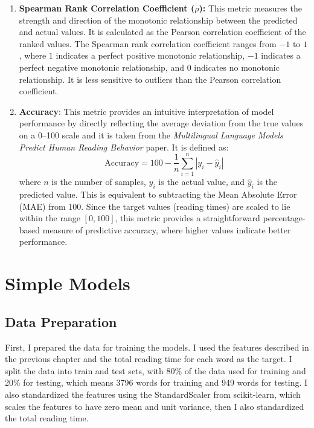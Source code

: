 \begin{enumerate}
    \item \textbf{Spearman Rank Correlation Coefficient ($\rho$):} This metric measures the strength and direction of the monotonic relationship between the predicted and actual values. It is calculated as the Pearson correlation coefficient of the ranked values. The Spearman rank correlation coefficient ranges from $-1$ to $1$, where $1$ indicates a perfect positive monotonic relationship, $-1$ indicates a perfect negative monotonic relationship, and $0$ indicates no monotonic relationship. It is less sensitive to outliers than the Pearson correlation coefficient.
    
    \item \textbf{Accuracy}: This metric provides an intuitive interpretation of model performance by directly reflecting the average deviation from the true values on a 0–100 scale and it is taken from the \textit{Multilingual Language Models Predict Human Reading Behavior} \cite{hollenstein-etal-2021-multilingual} paper. It is defined as:
    \begin{equation}
        \text{Accuracy} = 100 - \frac{1}{n} \sum_{i=1}^{n} |y_i - \hat{y}_i|
    \end{equation}
    where \( n \) is the number of samples, \( y_i \) is the actual value, and \( \hat{y}_i \) is the predicted value. This is equivalent to subtracting the Mean Absolute Error (MAE) from 100. Since the target values (reading times) are scaled to lie within the range \([0, 100]\), this metric provides a straightforward percentage-based measure of predictive accuracy, where higher values indicate better performance.
\end{enumerate}


\section{Simple Models}

\subsection{Data Preparation}
First, I prepared the data for training the models. I used the features described in the previous chapter and the total reading time for each word as the target. I split the data into train and test sets, with 80\% of the data used for training and 20\% for testing, which means 3796 words for training and 949 words for testing. I also standardized the features using the StandardScaler from scikit-learn, which scales the features to have zero mean and unit variance, then I also standardized the total reading time.

